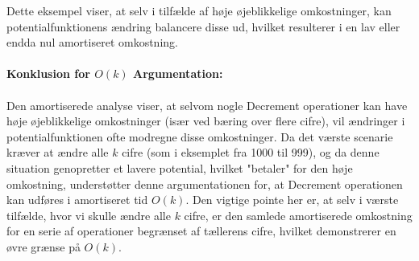 \documentclass{article}
\begin{document}
Dette eksempel viser, at selv i tilfælde af høje øjeblikkelige omkostninger, kan potentialfunktionens ændring balancere disse ud, hvilket resulterer i en lav eller endda nul amortiseret omkostning.
\\
\\
\textbf{Konklusion for $O(k)$ Argumentation:}
\\
\\
Den amortiserede analyse viser, at selvom nogle Decrement operationer kan have høje øjeblikkelige omkostninger (især ved bæring over flere cifre), vil ændringer i potentialfunktionen ofte modregne disse omkostninger. Da det værste scenarie kræver at ændre alle $k$ cifre (som i eksemplet fra 1000 til 999), og da denne situation genopretter et lavere potential, hvilket "betaler" for den høje omkostning, understøtter denne argumentationen for, at Decrement operationen kan udføres i amortiseret tid $O(k)$. Den vigtige pointe her er, at selv i værste tilfælde, hvor vi skulle ændre alle $k$ cifre, er den samlede amortiserede omkostning for en serie af operationer begrænset af tællerens cifre, hvilket demonstrerer en øvre grænse på $O(k)$.
\end{document}
